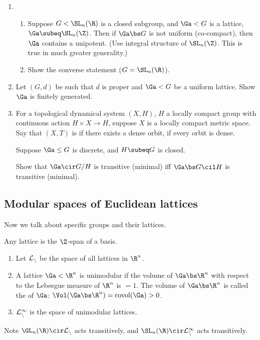 \begin{exr}
\begin{enumerate}
\item
\begin{enumerate}
\item
Suppose $G< \SL_n(\R)$ is a closed subgroup, and $\Ga<G$ is a lattice, $\Ga\subeq \SL_n(\Z)$. Then if $\Ga\bs G$ is not uniform (co-compact), then $\Ga$ contains a unipotent. (Use integral structure of $\SL_n(\Z)$. This is true in much greater generality.)
\item
Show the converse statement ($G=\SL_n(\R)$). 
\end{enumerate}
\item
Let $(G,d)$ be such that $d$ is proper and $\Ga<G$ be a uniform lattice. Show $\Ga$ is finitely generated.
\item
\begin{df}
For a topological dynamical system $(X,H)$, $H$ a locally compact group with continuous action $H\times X\to H$, suppose $X$ is a locally compact metric space. %
Say that $(X,T)$ is  if there exists a dense orbit,  if every orbit is dense.
\end{df}
Suppose $\Ga\le G$ is discrete, and $H\subeq G$ is closed.

Show that $\Ga\cir G/H$ is transitive (minimal) iff $\Ga\bs G\cil H$ is transitive (minimal). 
\end{enumerate}
\end{exr}

\subsection{Modular spaces of Euclidean lattices}
Now we talk about specific groups and their lattices. 

Any lattice is the $\Z$-span of a basis. 
\begin{df}
\begin{enumerate}
\item
Let $\cal L_n$ be the space of all lattices in $\R^n$.
\item
A lattice $\Ga< \R^n$ is unimodular if the volume of $\Ga\bs \R^n$ with respect to the Lebesgue measure of $\R^n$ is $=1$. The volume of $\Ga\bs \R^n$ is called the  of $\Ga$: 
 $\Vol (\Ga\bs \R^n) = \text{covol}(\Ga)>0$. 
\item
$\cal L_n^1$ is the space of unimodular lattices.
\end{enumerate}
\end{df}
Note $\GL_n(\R) \cir \cal L_n$ acts transitively, and $\SL_n(\R) \cir \cal L_n^1$ acts transitively. 

